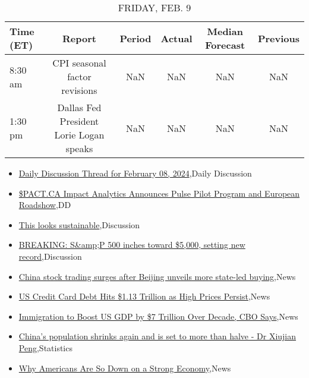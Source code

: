 \documentclass{article}%
\begin{document}
%


\begin{table}[htbp]%
\caption{FRIDAY, FEB. 9}%
\centering%
\begin{adjustbox}{width=1\textwidth}%
\begin{tabular}{lccccc}
\toprule
Time (ET) &                                  Report & Period & Actual & Median Forecast & Previous \\
\midrule
  8:30 am &           CPI seasonal factor revisions &    NaN &    NaN &             NaN &      NaN \\
  1:30 pm & Dallas Fed President Lorie Logan speaks &    NaN &    NaN &             NaN &      NaN \\
\bottomrule
\end{tabular}
%
\end{adjustbox}%
\end{table}

%
\begin{itemize}%
\item%
\href{https://reddit.com/r/wallstreetbets/comments/1alt69p/daily\_discussion\_thread\_for\_february\_08\_2024/}{Daily Discussion Thread for February 08, 2024},Daily Discussion%
\item%
\href{https://reddit.com/r/Baystreetbets/comments/1al2to0/pactca\_impact\_analytics\_announces\_pulse\_pilot/}{\$PACT.CA Impact Analytics Announces Pulse Pilot Program and European Roadshow},DD%
\item%
\href{https://reddit.com/r/StockMarket/comments/1algfci/this\_looks\_sustainable/}{This looks sustainable},Discussion%
\item%
\href{https://reddit.com/r/StockMarket/comments/1alc4f5/breaking\_sp\_500\_inches\_toward\_5000\_setting\_new/}{BREAKING: S\&amp;P 500 inches toward \$5,000, setting new record},Discussion%
\item%
\href{https://reddit.com/r/Economics/comments/1aloi8o/china\_stock\_trading\_surges\_after\_beijing\_unveils/}{China stock trading surges after Beijing unveils more state-led buying},News%
\item%
\href{https://reddit.com/r/Economics/comments/1alm629/us\_credit\_card\_debt\_hits\_113\_trillion\_as\_high/}{US Credit Card Debt Hits \$1.13 Trillion as High Prices Persist},News%
\item%
\href{https://reddit.com/r/Economics/comments/1all8a2/immigration\_to\_boost\_us\_gdp\_by\_7\_trillion\_over/}{Immigration to Boost US GDP by \$7 Trillion Over Decade, CBO Says},News%
\item%
\href{https://reddit.com/r/Economics/comments/1all0a4/chinas\_population\_shrinks\_again\_and\_is\_set\_to/}{China's population shrinks again and is set to more than halve - Dr Xiujian Peng},Statistics%
\item%
\href{https://reddit.com/r/Economics/comments/1alk4nz/why\_americans\_are\_so\_down\_on\_a\_strong\_economy/}{Why Americans Are So Down on a Strong Economy},News%
\end{itemize}%
\end{document}
